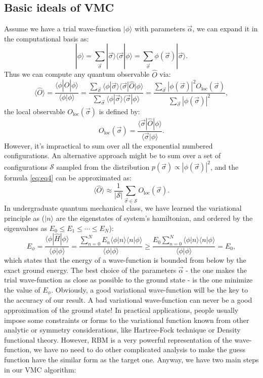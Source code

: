 \documentclass[letterpaper, 10pt]{article}
\newcommand{\qbar}{\rangle}
\newcommand{\qket}{\langle}
\begin{document}
\subsection{Basic ideals of VMC}
Assume we have a trial wave-function $|\phi\qbar$ with parameters $\vec{\alpha}$, we can expand it in the computational basis as:
\[ | \phi \qbar = \sum_{\vec{\sigma}} |\vec{\sigma}\qbar \qket \vec{\sigma}| \phi \qbar = \sum_{\vec{\sigma}} \phi(\vec{\sigma}) | \vec{\sigma} \qbar. \]
Thus we can compute any quantum observable $\hat{O}$ via:
\begin{equation}
\qket \hat{O} \qbar = \frac{\qket \phi | \hat{O} | \phi \qbar}{\qket \phi | \phi \qbar} = \frac{\sum_{\vec{\sigma}} \qket \phi | \vec{\sigma} \qbar \qket \vec{\sigma} | \hat{O} | \phi \qbar}{\sum_{\vec{\sigma}} \qket \phi | \vec{\sigma} \qbar \qket \vec{\sigma} | \phi \qbar} = \frac{\sum_{\vec{\sigma}} | \phi(\vec{\sigma}) |^2 O_\text{loc}(\vec{\sigma})}{\sum_{\vec{\sigma}} | \phi(\vec{\sigma}) |^2},
\label{eq:eq4}
\end{equation}
the local observable $O_\text{loc}(\vec{\sigma})$ is defined by:
\[ O_\text{loc}(\vec{\sigma}) = \frac{\qket \vec{\sigma} | \hat{O} | \phi \qbar}{\qket \vec{\sigma} | \phi \qbar}. \]
However, it's impractical to sum over all the exponential numbered configurations. An alternative approach might be to sum over a set of configurations $\mathcal{S}$ sampled from the distribution $p(\vec{\sigma}) \propto | \phi(\vec{\sigma}) |^2$, and the formula \ref{eq:eq4} can be approximated as:
\begin{equation}
\qket \hat{O} \qbar \approx \frac{1}{|\mathcal{S}|} \sum_{\vec{\sigma} \in \mathcal{S}} O_\text{loc}(\vec{\sigma}).
\label{eq:eq5}
\end{equation}
In undergraduate quantum mechanical class, we have learned the variational principle as ($| n \qbar$ are the eigenstates of system's hamiltonian, and ordered by the eigenvalues as $E_0 \leq E_1 \leq \cdots \leq E_N $):
\[ E_\phi = \frac{\qket \phi | \hat{H} | \phi \qbar}{\qket \phi | \phi \qbar} = \frac{\sum_{n=0}^{N} E_n \qket \phi | n \qbar \qket n | \phi \qbar}{\qket \phi | \phi \qbar} \geq \frac{E_0 \sum_{n=0}^{N}  \qket \phi | n \qbar \qket n | \phi \qbar}{\qket \phi | \phi \qbar} = E_0,\]
which states that the energy of a wave-function is bounded from below by the exact ground energy. The best choice of the parameters $\vec{\alpha}$ - the one makes the trial wave-function as close as possible to the ground state - is the one minimize the value of $E_\phi$. Obviously, a good variational wave-function will be the key to the accuracy of our result. A bad variational wave-function can never be a good approximation of the ground state! In practical applications, people usually impose some constraints or forms to the variational function known from other analytic or symmetry considerations, like Hartree-Fock technique or Density functional theory. However, RBM is a very powerful representation of the wave-function, we have no need to do other complicated analysis to make the guess function have the similar form as the target one. Anyway, we have two main steps in our VMC algorithm:
\end{document}
